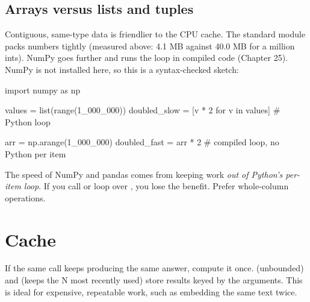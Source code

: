 \subsection{Arrays versus lists and tuples}

Contiguous, same-type data is friendlier to the CPU cache. The standard  module
packs numbers tightly (measured above: 4.1 MB against 40.0 MB for a million ints). NumPy goes
further and runs the loop in compiled code (Chapter 25). NumPy is not installed here, so this is a
syntax-checked sketch:

\begin{pycode}
import numpy as np

values = list(range(1_000_000))
doubled_slow = [v * 2 for v in values]       # Python loop

arr = np.arange(1_000_000)
doubled_fast = arr * 2                       # compiled loop, no Python per item
\end{pycode}

\begin{typecheck}
The speed of NumPy and pandas comes from keeping work \emph{out of Python's per-item loop}. If you
call  or loop over , you lose the benefit. Prefer whole-column
operations.
\end{typecheck}

\section{Cache}

If the same call keeps producing the same answer, compute it once.  (unbounded)
and  (keeps the N most recently used) store results keyed by the
arguments. This is ideal for expensive, repeatable work, such as embedding the same text twice.

\begin{center}
\end{center}

